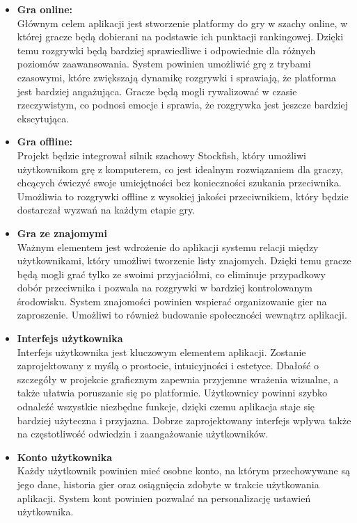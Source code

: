 \documentclass[12pt,a4paper]{article}
\begin{document}
\begin{itemize}
    \item \textbf{Gra online:}\\
    Głównym celem aplikacji jest stworzenie platformy do gry w szachy online, w której gracze będą dobierani na podstawie ich punktacji rankingowej. Dzięki temu rozgrywki będą bardziej sprawiedliwe i odpowiednie dla różnych poziomów zaawansowania. System powinien umożliwić grę z trybami czasowymi, które zwiększają dynamikę rozgrywki i sprawiają, że platforma jest bardziej angażująca. Gracze będą mogli rywalizować w czasie rzeczywistym, co podnosi emocje i sprawia, że rozgrywka jest jeszcze bardziej ekscytująca.

    \item \textbf{Gra offline:}\\
    Projekt będzie integrował silnik szachowy Stockfish, który umożliwi użytkownikom grę z komputerem, co jest idealnym rozwiązaniem dla graczy, chcących ćwiczyć swoje umiejętności bez konieczności szukania przeciwnika. Umożliwia to rozgrywki offline z wysokiej jakości przeciwnikiem, który będzie dostarczał wyzwań na każdym etapie gry.

    \item \textbf{Gra ze znajomymi}\\
    Ważnym elementem jest wdrożenie do aplikacji systemu relacji między użytkownikami, który umożliwi tworzenie listy znajomych. Dzięki temu gracze będą mogli grać tylko ze swoimi przyjaciółmi, co eliminuje przypadkowy dobór przeciwnika i pozwala na rozgrywki w bardziej kontrolowanym środowisku. System znajomości powinien wspierać organizowanie gier na zaproszenie. Umożliwi to również budowanie społeczności wewnątrz aplikacji.

    \item \textbf{Interfejs użytkownika}\\
    Interfejs użytkownika jest kluczowym elementem aplikacji. Zostanie zaprojektowany z myślą o prostocie, intuicyjności i estetyce. Dbałość o szczegóły w projekcie graficznym zapewnia przyjemne wrażenia wizualne, a także ułatwia poruszanie się po platformie. Użytkownicy powinni szybko odnaleźć wszystkie niezbędne funkcje, dzięki czemu aplikacja staje się bardziej użyteczna i przyjazna. Dobrze zaprojektowany interfejs wpływa także na częstotliwość odwiedzin i zaangażowanie użytkowników.

    \item \textbf{Konto użytkownika}\\
    Każdy użytkownik powinien mieć osobne konto, na którym przechowywane są jego dane, historia gier oraz osiągnięcia zdobyte w trakcie użytkowania aplikacji. System kont powinien pozwalać na personalizację ustawień użytkownika.


\end{itemize}
\end{document}
